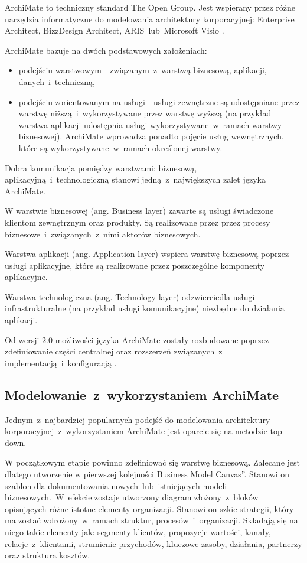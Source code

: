 ArchiMate to techniczny standard The Open Group. Jest wspierany przez różne narzędzia informatyczne do modelowania architektury korporacyjnej: Enterprise Architect, BizzDesign Architect, ARIS~lub~Microsoft Visio \cite{OpenGrArch}.

ArchiMate bazuje na dwóch podstawowych założeniach:
\begin{itemize}
\item{podejściu warstwowym - związanym~z~warstwą biznesową, aplikacji, danych~i~techniczną,}
\item{podejściu zorientowanym na usługi - usługi zewnętrzne są udostępniane przez warstwę niższą~i~wykorzystywane przez warstwę wyższą (na przykład warstwa aplikacji udostępnia usługi wykorzystywane~w~ramach warstwy biznesowej). ArchiMate wprowadza ponadto pojęcie usług wewnętrznych, które są wykorzystywane~w~ramach określonej warstwy.}
\end{itemize}

Dobra komunikacja pomiędzy warstwami: biznesową, aplikacyjną~i~technologiczną stanowi jedną~z~największych zalet języka ArchiMate.

W warstwie biznesowej (ang. Business layer) zawarte są usługi świadczone klientom zewnętrznym oraz produkty. Są realizowane przez przez procesy biznesowe~i~związanych~z~nimi aktorów biznesowych.

Warstwa aplikacji (ang. Application layer) wspiera warstwę biznesową poprzez usługi aplikacyjne, które są realizowane przez poszczególne komponenty aplikacyjne.

Warstwa technologiczna (ang. Technology layer) odzwierciedla usługi infrastrukturalne (na przykład usługi komunikacyjne) niezbędne do działania aplikacji.

Od wersji 2.0 możliwości języka ArchiMate zostały rozbudowane poprzez zdefiniowanie części centralnej oraz rozszerzeń związanych~z~ implementacją~i~konfiguracją \cite{ArchKorpSob}.

\subsection{Modelowanie~z~wykorzystaniem ArchiMate}
Jednym~z~najbardziej popularnych podejść do modelowania architektury korporacyjnej~z~wykorzystaniem ArchiMate jest oparcie się na metodzie top-down. 

W początkowym etapie powinno zdefiniować się warstwę biznesową. Zalecane jest dlatego utworzenie w pierwszej kolejności \quotedblbase Business Model Canvas\textquotedblright. Stanowi on szablon dla dokumentowania nowych~lub~istniejących modeli biznesowych.~W~efekcie zostaje utworzony diagram złożony~z~bloków opisujących różne istotne elementy organizacji. Stanowi on szkic strategii, który ma zostać wdrożony~w~ramach struktur, procesów~i~organizacji. Składają się na niego takie elementy jak: segmenty klientów, propozycje wartości, kanały, relacje~z~klientami, strumienie przychodów, kluczowe zasoby, działania, partnerzy oraz struktura kosztów. 

